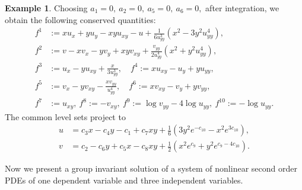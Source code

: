 \documentclass[a4paper, 11pt]{amsart}
\theoremstyle{definition}
\newtheorem{example}[theorem]{Example}
\begin{document}
\begin{example}
Choosing $a_1=0,~a_2=0,~a_5=0,~a_6=0,$ after integration, we obtain the following conserved quantities:
\begin{align*}
f^1&:=xu_x+yu_y-xyu_{xy}-u+\frac{1}{6u_{yy}^3}(x^2-3y^2u_{yy}^4),\\
f^2&:=v-xv_x-yv_y+xyv_{xy}+\frac{v_{yy}}{2u_{yy}^4}(x^2+y^2u_{yy}^4),\\
f^3&:=u_x-yu_{xy}+\frac{x}{3u_{yy}^3},\quad  f^4:=xu_{xy}-u_y+yu_{yy},\\
 f^5&:=v_{x}-yv_{xy}-\frac{xv_{yy}}{u_{yy}^4},\quad f^6:=xv_{xy}-v_y+yv_{yy},\\
 f^7&:=u_{xy},~ f^8:=-v_{xy},~f^9:=\log v_{yy}-4\log u_{yy},~f^{10}:=-\log u_{yy}.
\end{align*}
The common level sets project to
\begin{align*}
  u&=c_3x-c_4y-c_1+c_7xy+\frac{1}{6}(3y^2e^{-c_{10}}-x^2e^{3c_{10}}),\\
  v&=c_2-c_6y+c_5x-c_8xy+\frac{1}{2}(x^2e^{c_{9}}+y^2e^{c_{9}-4c_{10}}).
\end{align*}

\end{example}
Now we present a group invariant solution of a system of nonlinear second order PDEs of one dependent variable and three independent variables.
\end{document}
